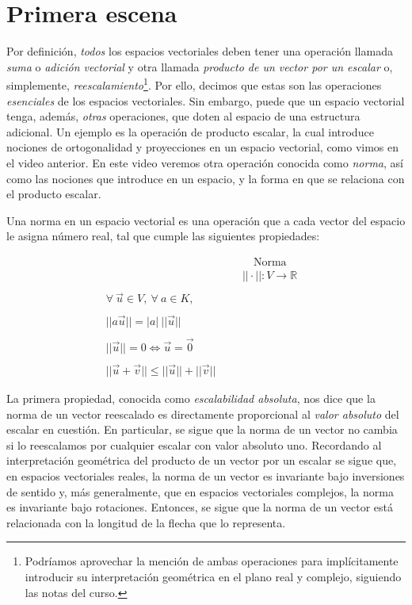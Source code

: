 \documentclass[12pt,dvipsnames]{article}
\numberwithin{equation}{section}
\begin{document}

\newpage
\section{Primera escena}

Por definición, \emph{todos} los espacios vectoriales deben tener una operación llamada \emph{suma} o \emph{adición vectorial} y otra llamada \emph{producto de un vector por un escalar} o, simplemente, \emph{reescalamiento}\footnote{Podríamos aprovechar la mención de ambas operaciones para implícitamente introducir su interpretación geométrica en el plano real y complejo, siguiendo las notas del curso.}. Por ello, decimos que estas son las operaciones \emph{esenciales} de los espacios vectoriales. Sin embargo, puede que un espacio vectorial tenga, además, \emph{otras} operaciones, que doten al espacio de una estructura adicional. Un ejemplo es la operación de producto escalar, la cual introduce nociones de ortogonalidad y proyecciones en un espacio vectorial, como vimos en el video anterior. En este video veremos otra operación conocida como \emph{norma}, así como las nociones que introduce en un espacio, y la forma en que se relaciona con el producto escalar.

Una norma en un espacio vectorial es una operación que a cada vector del espacio le asigna número real, tal que cumple las siguientes propiedades:

\begin{align*}
     & & &\quad \text{Norma}& \\
     & & &||\cdot||:V\to \mathbb{R}& \\
     \\
     \forall \ \vec{u}\in V, \ \forall \ a\in K, \\
     \\
     ||a\vec{u}|| = |a| \ ||\vec{u}||\\
     \\
     ||\vec{u}|| = 0 \iff \vec{u} = \vec{0}\\
     \\
     ||\vec{u}+\vec{v}|| \le ||\vec{u}|| + ||\vec{v}||
\end{align*}

La primera propiedad, conocida como \emph{escalabilidad absoluta}, nos dice que la norma de un vector reescalado es directamente proporcional al \emph{valor absoluto} del escalar en cuestión. En particular, se sigue que la norma de un vector no cambia si lo reescalamos por cualquier escalar con valor absoluto uno. Recordando al interpretación geométrica del producto de un vector por un escalar se sigue que, en espacios vectoriales reales, la norma de un vector es invariante bajo inversiones de sentido y, más generalmente, que en espacios vectoriales complejos, la norma es invariante bajo rotaciones. Entonces, se sigue que la norma de un vector está relacionada con la longitud de la flecha que lo representa.
\end{document}
